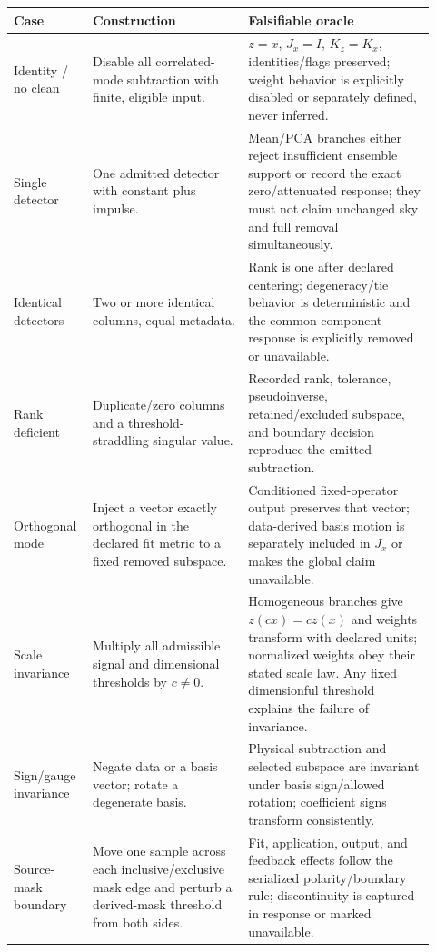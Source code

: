 \documentclass[11pt]{article}
\begin{document}
\small
\begin{longtable}{>{\raggedright\arraybackslash}p{0.15\linewidth}
                  >{\raggedright\arraybackslash}p{0.35\linewidth}
                  >{\raggedright\arraybackslash}p{0.42\linewidth}}
\toprule
Case & Construction & Falsifiable oracle \\
\midrule
\endhead
Identity / no clean & Disable all correlated-mode subtraction with finite,
eligible input. & $z=x$, $J_x=I$, $K_z=K_x$, identities/flags preserved;
weight behavior is explicitly disabled or separately defined, never inferred.\\
Single detector & One admitted detector with constant plus impulse. & Mean/PCA
branches either reject insufficient ensemble support or record the exact
zero/attenuated response; they must not claim unchanged sky and full removal
simultaneously.\\
Identical detectors & Two or more identical columns, equal metadata. & Rank is
one after declared centering; degeneracy/tie behavior is deterministic and
the common component response is explicitly removed or unavailable.\\
Rank deficient & Duplicate/zero columns and a threshold-straddling singular
value. & Recorded rank, tolerance, pseudoinverse, retained/excluded subspace,
and boundary decision reproduce the emitted subtraction.\\
Orthogonal mode & Inject a vector exactly orthogonal in the declared fit
metric to a fixed removed subspace. & Conditioned fixed-operator output
preserves that vector; data-derived basis motion is separately included in
$J_x$ or makes the global claim unavailable.\\
Scale invariance & Multiply all admissible signal and dimensional thresholds
by $c\ne0$. & Homogeneous branches give $z(cx)=c z(x)$ and weights transform
with declared units; normalized weights obey their stated scale law.  Any
fixed dimensionful threshold explains the failure of invariance.\\
Sign/gauge invariance & Negate data or a basis vector; rotate a degenerate
basis. & Physical subtraction and selected subspace are invariant under basis
sign/allowed rotation; coefficient signs transform consistently.\\
Source-mask boundary & Move one sample across each inclusive/exclusive mask
edge and perturb a derived-mask threshold from both sides. & Fit, application,
output, and feedback effects follow the serialized polarity/boundary rule;
discontinuity is captured in response or marked unavailable.\\

\end{longtable}
\end{document}
